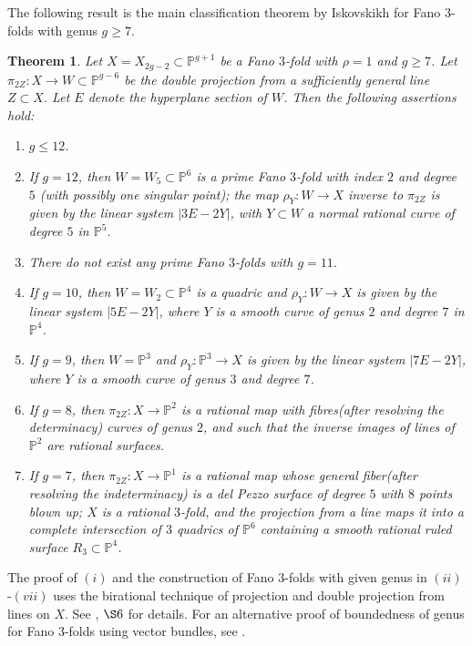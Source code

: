\documentclass[11pt]{amsart}
\theoremstyle{plain}
\newtheorem{theorem}{Theorem}[section]
\theoremstyle{definition}
\theoremstyle{expl}
\begin{document}
The following result is the main classification theorem by Iskovskikh for Fano $3$-folds with genus $g\geq 7$.
\begin{theorem}
    Let $X = X_{2g-2} \subset \mathbb{P}^{g+1}$ be a Fano $3$-fold with $\rho =1$ and $g\geq 7$. %
    Let $\pi_{2Z}: X \to W \subset \mathbb{P}^{g-6}$ be the double projection from a sufficiently general line $Z \subset X$. Let $E$ denote the hyperplane section of $W$. Then the following assertions hold:
    \begin{enumerate}
        \item[(i)] $g \leq 12$. 
        \item[(ii)] If $g=12$, then $W=W_5 \subset \mathbb{P}^6$ is a prime Fano $3$-fold with index $2$ and degree $5$ (with possibly one singular point); the map $\rho_Y :W \to X$ inverse to $\pi_{2Z}$ is given by the linear system $|3E-2Y|$, with $Y \subset W$ a normal rational curve of degree $5$ in $\mathbb{P}^5$.
        \item[(iii)] There do not exist any prime Fano $3$-folds with $g=11$. 
        \item[(iv)] If $g=10$, then $W= W_2 \subset \mathbb{P}^4$ is a quadric and $\rho_Y : W \to X$ is given by the linear system $|5E-2Y|$, where $Y$ is a smooth curve of genus $2$ and degree $7$ in $\mathbb{P}^4$.
        \item[(v)] If $g=9$, then $W= \mathbb{P}^3$ and $\rho_Y : \mathbb{P}^3 \to X$ is given by the linear system $|7E-2Y|$, where $Y$ is a smooth curve of genus $3$ and degree $7$.
        \item[(vi)] If $g=8$, then $\pi_{2Z}: X \to \mathbb{P}^2$ is a rational map with fibres(after resolving the determinacy) curves of genus $2$, and such that the inverse images of lines of $\mathbb{P}^2$ are rational surfaces.
        \item[(vii)] If $g=7$, then $\pi_{2Z}: X \to \mathbb{P}^1$ is a rational map whose general fiber(after resolving the indeterminacy) is a del Pezzo surface of degree $5$ with $8$ points blown up; $X$ is a rational $3$-fold, and the projection from a line maps it into a complete intersection of $3$ quadrics of $\mathbb{P}^6$ containing a smooth rational ruled surface $R_3 \subset \mathbb{P}^4$.
        \end{enumerate}
\end{theorem}
The proof of $(i)$ and the construction of Fano $3$-folds with given genus in $(ii)$-$(vii)$ uses the birational technique of projection and double projection from lines on $X$. See \cite{Isk78}, $\S 6$ for details.
For an alternative proof of boundedness of genus for Fano $3$-folds using vector bundles, see \cite{Muk92}.
	    
\end{document}
